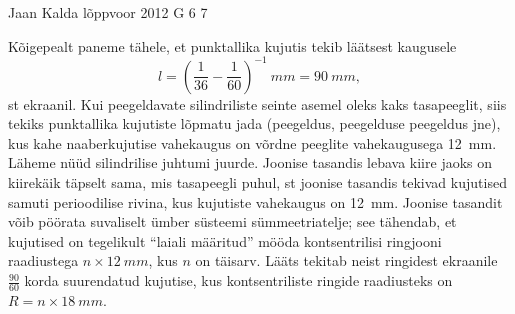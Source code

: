 \documentclass[11pt]{article}
\begin{document}
{{\begin{center}
\end{center}
\fi
}

{Jaan Kalda} %
{lõppvoor} %
{2012} %
{G 6} %
{7} %
{

\ifSolution
Kõigepealt paneme tähele, et punktallika kujutis tekib läätsest kaugusele
$$l=\left(\frac 1{36}-\frac 1{60}\right)^{-1}\SI{}{mm}=\SI{90}{mm},$$
st ekraanil. Kui peegeldavate silindriliste seinte asemel oleks kaks tasapeeglit, siis
tekiks punktallika kujutiste lõpmatu jada (peegeldus, peegelduse peegeldus jne), kus 
kahe naaberkujutise vahekaugus on võrdne peeglite vahekaugusega \SI{12}{mm}. 
Läheme nüüd silindrilise juhtumi juurde. Joonise tasandis lebava kiire jaoks on 
kiirekäik täpselt sama, mis tasapeegli puhul, st joonise tasandis tekivad kujutised samuti 
perioodilise rivina, kus kujutiste vahekaugus on \SI{12}{mm}. Joonise tasandit võib pöörata suvaliselt
ümber süsteemi sümmeetriatelje; see tähendab, et kujutised on tegelikult \enquote{laiali määritud} mööda kontsentrilisi
ringjooni raadiustega $n\times\SI{12}{mm}$, kus $n$ on täisarv. Lääts tekitab neist ringidest 
ekraanile $\frac{90}{60}$ korda suurendatud kujutise, 
kus kontsentriliste ringide raadiusteks on $R=n\times \SI{18}{mm}$.
\fi
}

}
\end{document}
